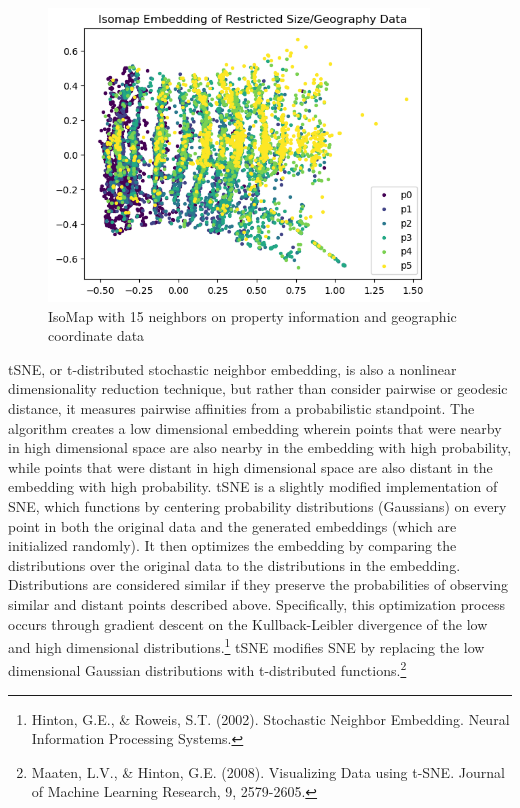 \documentclass[12pt]{article}
\newtheorem{Proof of Lemma}{Proof of Lemma}
\begin{document}
\begin{figure}[H]
	\begin{center}
		\includegraphics*[width=0.9\textwidth]{../figures/isomap_restricted_geo.png}
		\caption*{IsoMap with 15 neighbors on property information and geographic coordinate data}
	\end{center}
\end{figure}

tSNE, or t-distributed stochastic neighbor embedding, is also a nonlinear dimensionality reduction technique, but rather than consider pairwise or geodesic distance, it measures pairwise affinities from a probabilistic standpoint. The algorithm creates a low dimensional embedding wherein points that were nearby in high dimensional space are also nearby in the embedding with high probability, while points that were distant in high dimensional space are also distant in the embedding with high probability. tSNE is a slightly modified implementation of SNE, which functions by centering probability distributions (Gaussians) on every point in both the original data and the generated embeddings (which are initialized randomly). It then optimizes the embedding by comparing the distributions over the original data to the distributions in the embedding. Distributions are considered similar if they preserve the probabilities of observing similar and distant points described above. Specifically, this optimization process occurs through gradient descent on the Kullback-Leibler divergence of the low and high dimensional distributions.\footnote{Hinton, G.E., \& Roweis, S.T. (2002). Stochastic Neighbor Embedding. Neural Information Processing Systems.} tSNE modifies SNE by replacing the low dimensional Gaussian distributions with t-distributed functions.\footnote{Maaten, L.V., \& Hinton, G.E. (2008). Visualizing Data using t-SNE. Journal of Machine Learning Research, 9, 2579-2605.}
\end{document}
